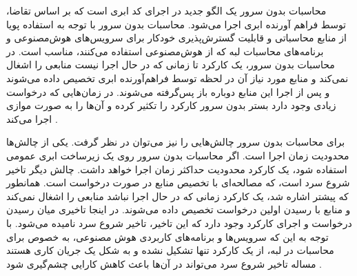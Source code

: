 
محاسبات بدون سرور یک الگو جدید در اجرای کد ابری است که بر اساس تقاضا، توسط فراهم آورنده ابری اجرا می‌شود.
محاسبات بدون سرور با توجه به استفاده پویا از منابع محاسباتی و قابلیت گسترش‌پذیری خودکار برای سرویس‌های هوش‌مصنوعی
و برنامه‌های محاسبات لبه که از هوش‌مصنوعی استفاده می‌کنند، مناسب است.
در محاسبات بدون سرور، یک کارکرد تا زمانی که در حال اجرا نیست منابعی را اشغال نمی‌کند و منابع مورد نیاز آن در لحظه توسط
فراهم‌آورنده ابری تخصیص داده می‌شوند و پس از اجرا این منابع دوباره باز پس‌گرفته می‌شوند.
در زمان‌هایی که درخواست زیادی وجود دارد بستر بدون سرور کارکرد را تکثیر کرده و آن‌ها را به صورت موازی اجرا می‌کند
.

برای محاسبات بدون سرور چالش‌هایی را نیز می‌توان در نظر گرفت.
یکی از چالش‌ها محدودیت زمان اجرا است. اگر محاسبات بدون سرور روی یک زیرساخت ابری عمومی
استفاده شود، یک کارکرد محدودیت حداکثر زمان اجرا خواهد داشت.
چالش دیگر تاخیر شروع سرد است، که مصالحه‌ای با تخصیص منابع در صورت درخواست است.
همانطور که پیشتر اشاره شد، یک کارکرد زمانی که در حال اجرا نباشد منابعی را اشغال نمی‌کند و منابع
با رسیدن اولین درخواست تخصیص داده می‌شوند.
در اینجا تاخیری میان رسیدن درخواست و اجرای کارکرد وجود دارد که این تاخیر، تاخیر شروع سرد نامیده می‌شود.
با توجه به این که سرویس‌ها و برنامه‌های کاربردی هوش مصنوعی، به خصوص برای محاسبات در لبه،
از یک کارکرد تنها تشکیل نشده و به شکل یک جریان کاری هستند مساله تاخیر شروع سرد می‌تواند در آن‌ها باعث
کاهش کارایی چشم‌گیری شود
.
